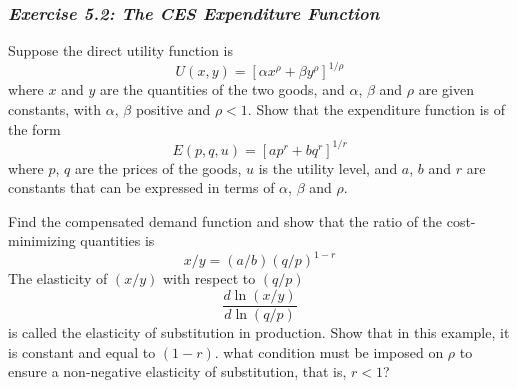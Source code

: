 \subsubsection*{\textit{Exercise 5.2: The CES Expenditure Function}}

Suppose the direct utility function is
\begin{equation} \label{equa5.24}
   U(x,y) = [\alpha x^\rho + \beta y^\rho]^{1/\rho}
\end{equation}
where $x$ and $y$ are the quantities of the two goods, and $\alpha$, $\beta$ and $\rho$ are given constants, with $\alpha$, $\beta$ positive and $\rho <1 $. Show that the expenditure function is of the form
\begin{equation} \label{equa5.25}
   E(p,q,u) = [a p^r + b q^r]^{1/r}
\end{equation}
where $p$, $q$ are the prices of the goods, $u$ is the utility level, and $a$, $b$ and $r$ are constants that can be expressed in terms of $\alpha$, $\beta$ and $\rho$.

Find the compensated demand function and show that the ratio of the cost-minimizing quantities is
\begin{equation*}
   x/y = (a/b)(q/p)^{1-r}
\end{equation*}
The elasticity of $(x/y)$ with respect to $(q/p)$
\begin{equation*}
   \dfrac{d \ln (x/y)}{d \ln (q/p)}
\end{equation*}
is called the elasticity of substitution in production. Show that in this example, it is constant and equal to $(1-r)$. what condition must be imposed on $\rho$ to ensure a non-negative elasticity of substitution, that is, $r<1$?


